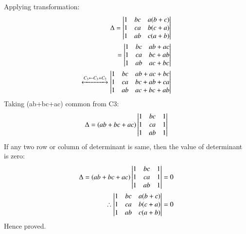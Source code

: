 Applying transformation:
\begin{align}
\Delta =\begin{vmatrix}1&bc&a(b+c)\\1&ca&b(c+a)\\1&ab&c(a+b)\end{vmatrix}\\
= \begin{vmatrix}1&bc&ab+ac\\1&ca&bc+ab\\1&ab&ac+bc\end{vmatrix}\\
\xleftrightarrow[]{C_3 \leftarrow C_3+ C_2 } 
\begin{vmatrix}1&bc&ab+ac+bc\\1&ca&bc+ab+ca\\1&ab&ac+bc+ab\end{vmatrix}
\end{align}
Taking (ab+bc+ac) common from C3:
\begin{align}
    \Delta =(ab+bc+ac)\begin{vmatrix}1&bc&1\\1&ca&1\\1&ab&1\end{vmatrix}
\end{align}
If any two row or column of determinant is same, then the value of determinant is zero:
\begin{align}
    \Delta =(ab+bc+ac)\begin{vmatrix}1&bc&1\\1&ca&1\\1&ab&1\end{vmatrix}=0\\
    \therefore \begin{vmatrix}1&bc&a(b+c)\\1&ca&b(c+a)\\1&ab&c(a+b)\end{vmatrix}=0
\end{align}
Hence proved.
